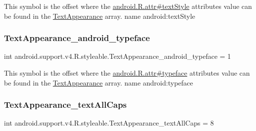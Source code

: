 This symbol is the offset where the \hyperlink{}{android.\+R.\+attr\#text\+Style} attribute\textquotesingle{}s value can be found in the \hyperlink{classandroid_1_1support_1_1v4_1_1R_1_1styleable_a81c402d7a6e327c354a1cf72b21fc4f5}{Text\+Appearance} array.  name android\+:text\+Style \mbox{\label{classandroid_1_1support_1_1v4_1_1R_1_1styleable_a9e3a6684a7a098b28524ba5b3ce100f9}} 
\subsubsection{\texorpdfstring{Text\+Appearance\+\_\+android\+\_\+typeface}{TextAppearance\_android\_typeface}}
{\footnotesize\ttfamily int android.\+support.\+v4.\+R.\+styleable.\+Text\+Appearance\+\_\+android\+\_\+typeface = 1\hspace{0.3cm}{\ttfamily [static]}}

This symbol is the offset where the \hyperlink{}{android.\+R.\+attr\#typeface} attribute\textquotesingle{}s value can be found in the \hyperlink{classandroid_1_1support_1_1v4_1_1R_1_1styleable_a81c402d7a6e327c354a1cf72b21fc4f5}{Text\+Appearance} array.  name android\+:typeface \mbox{\label{classandroid_1_1support_1_1v4_1_1R_1_1styleable_a1e1460f50d695fa2b57fa98b9d12a63e}} 
\subsubsection{\texorpdfstring{Text\+Appearance\+\_\+text\+All\+Caps}{TextAppearance\_textAllCaps}}
{\footnotesize\ttfamily int android.\+support.\+v4.\+R.\+styleable.\+Text\+Appearance\+\_\+text\+All\+Caps = 8\hspace{0.3cm}{\ttfamily [static]}}

